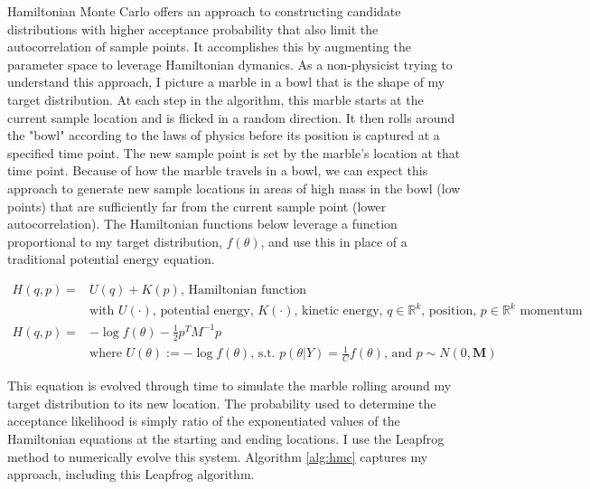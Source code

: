 \documentclass{article}
\begin{document}
Hamiltonian Monte Carlo offers an approach to constructing candidate distributions with higher acceptance probability that also limit the autocorrelation of sample points. It accomplishes this by augmenting the parameter space to leverage Hamiltonian dymanics. As a non-physicist trying to understand this approach, I picture a marble in a bowl that is the shape of my target distribution. At each step in the algorithm, this marble starts at the current sample location and is flicked in a random direction. It then rolls around the "bowl" according to the laws of physics before its position is captured at a specified time point. The new sample point is set by the marble's location at that time point. Because of how the marble travels in a bowl, we can expect this approach to generate new sample locations in areas of high mass in the bowl (low points) that are sufficiently far from the current sample point (lower autocorrelation). The Hamiltonian functions below leverage a function proportional to my target distribution, $f(\theta)$, and use this in place of a traditional potential energy equation. 

\begin{align}
  H(q, p) =& U(q) + K(p) \textrm{, Hamiltonian function}\\
  & \textrm{with $U(\cdot)$, potential energy, $K(\cdot)$, kinetic energy, $q \in \mathbb{R}^k$, position, $p \in \mathbb{R}^k$ momentum}\\
  H(q, p) =& -\log f(\theta) - \frac{1}{2}p^TM^{-1}p\\
  & \textrm{where } U(\theta) := -\log f(\theta) \textrm{, s.t. } p(\theta | Y) = \frac{1}{C}f(\theta) \textrm{, and } p \sim N(0, \textbf{M})
\end{align}

This equation is evolved through time to simulate the marble rolling around my target distribution to its new location. The probability used to determine the acceptance likelihood is simply ratio of the exponentiated values of the Hamiltonian equations at the starting and ending locations. I use the Leapfrog method to numerically evolve this system. Algorithm \ref{alg:hmc} captures my approach, including this Leapfrog algorithm.
\end{document}
